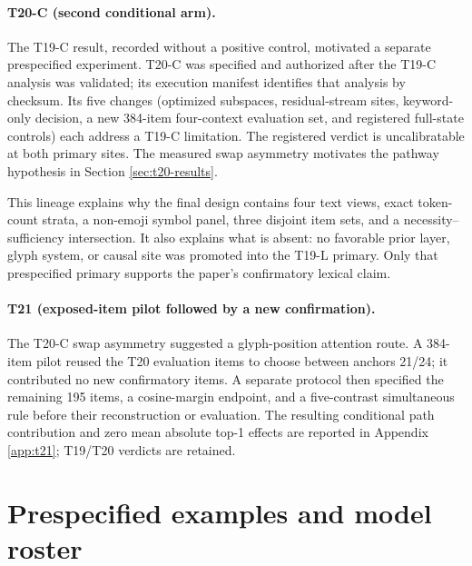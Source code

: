 \documentclass{article}
\begin{document}
\paragraph{T20-C (second conditional arm).}
The T19-C result, recorded without a positive control, motivated a separate
prespecified experiment. T20-C was specified and authorized after the T19-C
analysis was validated; its execution manifest identifies that analysis by
checksum. Its five changes (optimized subspaces, residual-stream sites,
keyword-only decision, a new 384-item four-context evaluation set, and
registered full-state controls) each address a T19-C limitation. The
registered verdict is uncalibratable at both primary sites. The measured
swap asymmetry motivates the pathway hypothesis in Section \ref{sec:t20-results}.

This lineage explains why the final design contains four text views, exact
token-count strata, a non-emoji symbol panel, three disjoint item sets, and a
necessity--sufficiency intersection. It also explains what is absent: no
favorable prior layer, glyph system, or causal site was promoted into the
T19-L primary. Only that prespecified primary supports the paper's confirmatory
lexical claim.

\paragraph{T21 (exposed-item pilot followed by a new confirmation).}
The T20-C swap asymmetry suggested a glyph-position attention route. A
384-item pilot reused the T20 evaluation items to choose between anchors
21/24; it contributed no new confirmatory items. A separate protocol then
specified the remaining 195 items, a cosine-margin endpoint, and a
five-contrast simultaneous rule before their reconstruction or evaluation.
The resulting conditional path contribution and zero mean absolute top-1
effects are reported in Appendix \ref{app:t21}; T19/T20 verdicts are retained.

\section{Prespecified examples and model roster}
\label{app:models}
\end{document}
